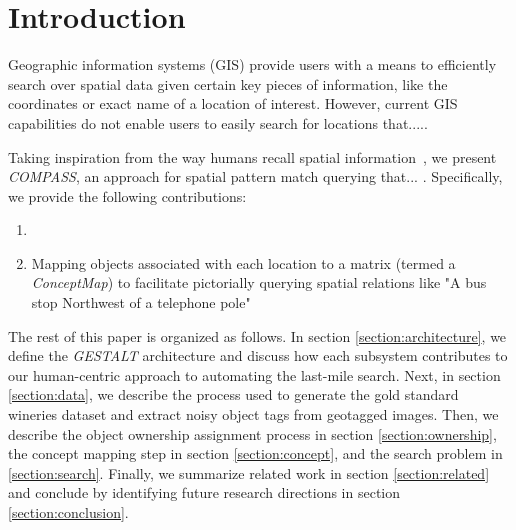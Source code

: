 \section{Introduction}
\label{section:introduction}
Geographic information systems (GIS) provide users with a means to efficiently search over spatial data given certain key pieces of information, like the coordinates or exact name of a location of interest. 
However, current GIS capabilities do not enable users to easily search for locations that.....



Taking inspiration from the way humans recall spatial information~\cite{Helbing2020, Oliveira2016, Weisberg2016},  we present \emph{COMPASS}, an approach for spatial pattern match querying that... . Specifically, we provide the following contributions:
\begin{enumerate}
    \item {}
    \item Mapping objects associated with each location to a matrix (termed a \emph{ConceptMap}) to facilitate pictorially querying spatial relations like "A bus stop Northwest of a telephone pole"
\end{enumerate}

The rest of this paper is organized as follows.  In section \ref{section:architecture}, we define the \emph{GESTALT} architecture and discuss how each subsystem contributes to our human-centric approach to automating the last-mile search. 
Next, in section \ref{section:data}, we describe the process used to generate the gold standard wineries dataset and extract noisy object tags from geotagged images. Then, we describe the object ownership assignment process in section \ref{section:ownership}, the concept mapping step in section \ref{section:concept}, and the search problem in \ref{section:search}. 
Finally, we summarize related work in section \ref{section:related} and conclude by identifying future research directions in section \ref{section:conclusion}.

